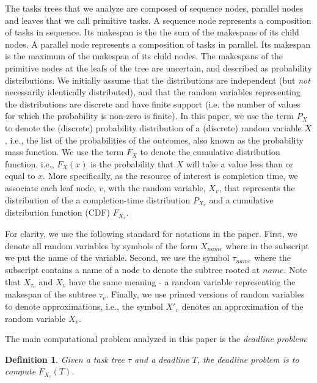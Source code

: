 \documentclass[review]{elsarticle}
\newtheorem{definition}{Definition}
\begin{document}
The tasks trees that we analyze are composed of sequence nodes, parallel nodes and leaves that we call primitive tasks. A sequence node represents a composition of tasks in sequence. Its makespan is the the sum of the makespans of its child nodes. A parallel node represents a composition of tasks in parallel. Its makespan is the maximum of the makespan of its child nodes.
The makespans of the primitive nodes at the leafs of the tree are uncertain, and described as probability distributions.
We initially assume  that the distributions are  independent (but {\em not} necessarily identically distributed), and that
the random variables representing the distributions are discrete and have finite support (i.e. the number of values for which the probability is non-zero is finite).
In this paper, we use the term $P_X$ to denote the (discrete) probability distribution of a (discrete) random variable $X$, i.e., the list of the probabilities of the outcomes, also known as the probability mass function. We use the term $F_X$ to denote the cumulative distribution function, i.e., $F_X(x)$ is the probability that $X$ will take a value less than or equal to $x$. More specifically, as the resource of interest is completion time, we associate each leaf node, $v$, with the random variable, $X_v$, that represents the distribution of the 
a completion-time distribution $P_{X_v}$ and a cumulative distribution function (CDF) $F_{X_v}$.

For clarity, we use the following standard for notations in the paper. First, we denote all random variables by symbols of the form $X_{name}$ where in the subscript we put the name of the variable. %
Second, we use the symbol $\tau_{name}$ where the subscript contains a name of a node to denote the subtree rooted  at $name$. Note that $X_{\tau_{v}}$ and $X_v$ have the same meaning - a random variable representing the makespan of the subtree $\tau_{v}$.
Finally, we use primed versions of random variables to denote approximations, i.e., the symbol $X'_{v}$ denotes an approximation of the random variable $X_{v}$.

The main computational problem analyzed in this paper is the {\em deadline problem}: 
\begin{definition}\label{Def:Deadline}
	Given a task tree $\tau $ and a deadline $T$, the \emph{deadline problem} is to compute $F_{X_\tau}(T)$.
\end{definition}
\end{document}
